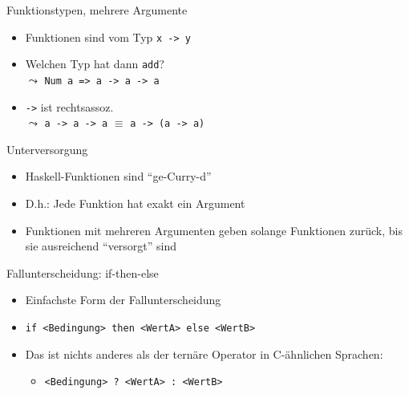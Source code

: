 \documentclass{beamer}
\begin{document}
\begin{frame}{Funktionstypen, mehrere Argumente}

        \begin{itemize}
                \item Funktionen sind vom Typ \texttt{x -> y}
                \item Welchen Typ hat dann \texttt{add}? \\
                \pause
                $\leadsto$ \texttt{Num a => a -> a -> a}
                \item \texttt{->} ist rechtsassoz. \\
                $\leadsto$ \texttt{a -> a -> a} $\equiv$ \texttt{a -> (a -> a)}
        \end{itemize}
\end{frame}

\begin{frame}{Unterversorgung}
        \begin{itemize}
                \item Haskell-Funktionen sind \enquote{ge-Curry-d}
                \item D.h.: Jede Funktion hat exakt ein Argument
                \item Funktionen mit mehreren Argumenten geben solange Funktionen zurück, bis sie ausreichend \enquote{versorgt} sind
        \end{itemize}

\end{frame}

\begin{frame}{Fallunterscheidung: if-then-else}

        \begin{itemize}
                \item Einfachste Form der Fallunterscheidung
                \item \texttt{if <Bedingung> then <WertA> else <WertB>}
                \pause
                \item Das ist nichts anderes als der ternäre Operator in C-ähnlichen Sprachen:
                \begin{itemize}
                        \item \texttt{<Bedingung> ? <WertA> : <WertB>}
                \end{itemize}
        \end{itemize}
\end{frame}
\end{document}
